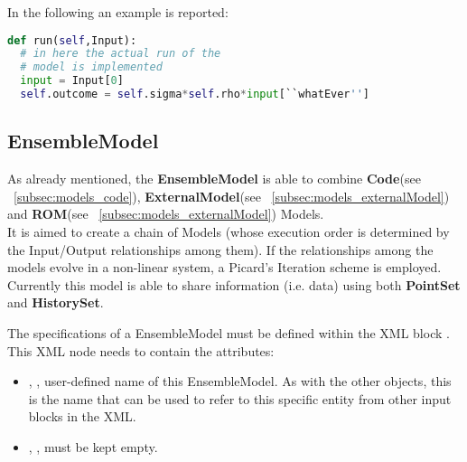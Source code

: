 In the following an example is reported:
\begin{lstlisting}[language=python]
def run(self,Input):
  # in here the actual run of the
  # model is implemented
  input = Input[0]
  self.outcome = self.sigma*self.rho*input[``whatEver'']
\end{lstlisting}

%






%
%

\subsection{EnsembleModel}
\label{subsec:models_EnsembleModel}
As already mentioned, the \textbf{EnsembleModel} is able to combine \textbf{Code}(see ~\ref{subsec:models_code}),
\textbf{ExternalModel}(see ~\ref{subsec:models_externalModel}) and \textbf{ROM}(see ~\ref{subsec:models_externalModel}) Models.
\\It is aimed to create a chain of Models (whose execution order is determined by the Input/Output relationships among them).
  If the relationships among the models evolve in a non-linear system, a Picard's Iteration scheme is employed.
\\Currently this model is able to share information (i.e. data) using both \textbf{PointSet} and \textbf{HistorySet}.

The specifications of a EnsembleModel must be defined within the XML block
.
%
This XML node needs to contain the attributes:

\vspace{-5mm}
\begin{itemize}
  \itemsep0em
  \item {}, , user-defined name
  of this EnsembleModel.
  \nb As with the other objects, this is the name that can be used to refer to
  this specific entity from other input blocks in the XML.
  \item {}, , must be kept
  empty.
\end{itemize}
\vspace{-5mm}

